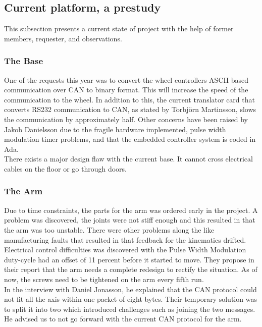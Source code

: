 \subsection{Current platform, a prestudy}
This subsection presents a current state of project with the help of former members, requester, and observations.

\subsubsection{The Base}
One of the requests this year was to convert the wheel controllers ASCII based communication over CAN to binary format. This will increase the speed of the communication to the wheel. In addition to this, the current translator card that converts RS232 communication to CAN, as stated by Torbjörn Martinsson, slows the communication by approximately half. Other concerns have been raised by Jakob Danielsson due to the fragile hardware implemented, pulse width modulation timer problems, and that the embedded controller system is coded in Ada.\\
\indent There exists a major design flaw with the current base. It cannot cross electrical cables on the floor or go through doors.

\subsubsection{The Arm}
Due to time constraints, the parts for the arm was ordered early in the project. A problem was discovered, the joints were not stiff enough and this resulted in that the arm was too unstable. There were other problems along the like manufacturing faults that resulted in that feedback for the kinematics drifted. Electrical control difficulties was discovered with the Pulse Width Modulation duty-cycle had an offset of 11 percent before it started to move. They propose in their report that the arm needs a complete redesign to rectify the situation. As of now, the screws need to be tightened on the arm every fifth run.\\
\indent In the interview with Daniel Jonasson, he explained that the CAN protocol could not fit all the axis within one packet of eight bytes. Their temporary solution was to split it into two which introduced challenges such as joining the two messages. He advised us to not go forward with the current CAN protocol for the arm.

